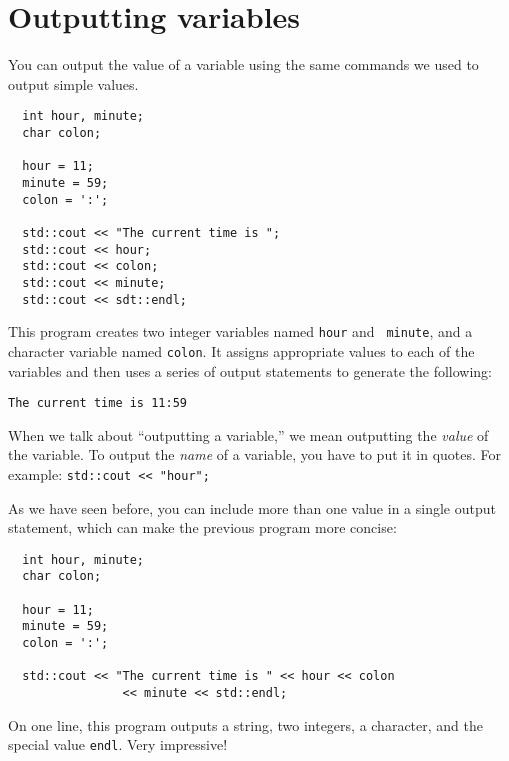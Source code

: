 \section{Outputting variables}
\label{output}

You can output the value of a variable using the same commands
we used to output simple values.
\begin{mdframed}
\begin{verbatim}
  int hour, minute;
  char colon;

  hour = 11;
  minute = 59;
  colon = ':';

  std::cout << "The current time is ";
  std::cout << hour;
  std::cout << colon;
  std::cout << minute;
  std::cout << sdt::endl;
\end{verbatim}
\end{mdframed}
%
This program creates two integer variables named {\tt hour} and {\tt
minute}, and a character variable named {\tt colon}.  It assigns
appropriate values to each of the variables and then uses a series
of output statements to generate the following:

\begin{verbatim}
The current time is 11:59
\end{verbatim}

When we talk about ``outputting a variable,'' we mean outputting the
{\em value} of the variable.  To output the {\em name} of a variable,
you have to put it in quotes.  For example: {\tt std::cout << "hour";}

As we have seen before, you can include more than one value in
a single output statement, which can make the previous program more
concise:

\begin{mdframed}

\begin{verbatim}
  int hour, minute;
  char colon;

  hour = 11;
  minute = 59;
  colon = ':';

  std::cout << "The current time is " << hour << colon 
                << minute << std::endl;
\end{verbatim}
\end{mdframed}
%
On one line, this program outputs a string, two integers, a character,
and the special value {\tt endl}.  Very impressive!


